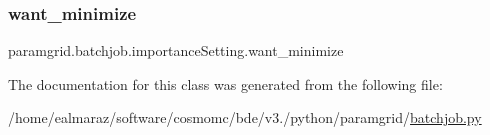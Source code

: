 \subsubsection{\texorpdfstring{want\+\_\+minimize}{want\_minimize}}
{\footnotesize\ttfamily paramgrid.\+batchjob.\+importance\+Setting.\+want\+\_\+minimize}



The documentation for this class was generated from the following file\+:\begin{DoxyCompactItemize}
\item 
/home/ealmaraz/software/cosmomc/bde/v3./python/paramgrid/\mbox{\hyperlink{batchjob_8py}{batchjob.\+py}}\end{DoxyCompactItemize}
